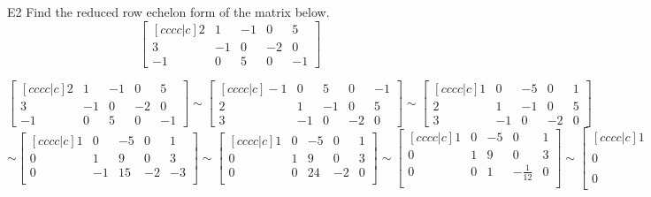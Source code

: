 \begin{problem}{E2}
Find the reduced row echelon form of the matrix below.
\[
  \begin{bmatrix}[cccc|c]
    2 & 1 & -1 & 0 & 5 \\
    3 & -1 & 0 & -2 & 0 \\
    -1 & 0 & 5 & 0 & -1
  \end{bmatrix}
\]
\end{problem}
\begin{solution}
\[
  \begin{bmatrix}[cccc|c]
   2 & 1 & -1 & 0 & 5 \\
   3 & -1 & 0 & -2 & 0 \\
   -1 & 0 & 5 & 0 & -1
  \end{bmatrix} \sim
  \begin{bmatrix}[cccc|c]
   -1 & 0 & 5 & 0 & -1  \\
   2 & 1 & -1 & 0 & 5 \\
   3 & -1 & 0 & -2 & 0
  \end{bmatrix} \sim
  \begin{bmatrix}[cccc|c]
   1 & 0 & -5 & 0 & 1 \\
   2 & 1 & -1 & 0 & 5 \\
   3 & -1 & 0 & -2 & 0
  \end{bmatrix}
\]
\[
  \sim
  \begin{bmatrix}[cccc|c]
   1 & 0 & -5 & 0 & 1  \\
   0 & 1 & 9 & 0 & 3 \\
   0 & -1 & 15 & -2 & -3 \\
  \end{bmatrix} \sim
  \begin{bmatrix}[cccc|c]
   1 & 0 & -5 & 0 & 1  \\
   0 & 1 & 9 & 0 & 3 \\
   0 & 0 & 24 & -2 & 0 \\
  \end{bmatrix} \sim
  \begin{bmatrix}[cccc|c]
   1 & 0 & -5 & 0 & 1 \\
   0 & 1 & 9 & 0 & 3 \\
   0 & 0 & 1 & -\frac{1}{12} & 0 \\
  \end{bmatrix} \sim
  \begin{bmatrix}[cccc|c]
  1 & 0 & 0 & -\frac{5}{12} & 1 \\
   0 & 1 & 0 & \frac{3}{4} & 3 \\
   0 & 0 & 1 & -\frac{1}{12} & 0
  \end{bmatrix}
\]
\end{solution}

